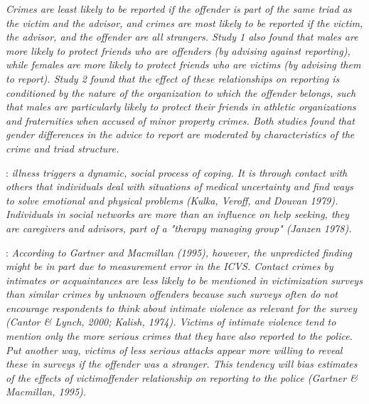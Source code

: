 \documentclass[]{article}
\begin{document}
	\cite{knoth2019reporting}
	\textit{Crimes are least likely to be reported if the offender is part of the same triad as the victim and the advisor, and crimes are most likely to be reported if the victim, the advisor, and the offender are all strangers. Study 1 also found that males are more likely to protect friends who are offenders (by advising against reporting), while females are more likely to protect friends who are victims (by advising them to report). Study 2 found that the effect of these relationships on reporting is conditioned by the nature of the organization to which the offender belongs, such that males are particularly likely to protect their friends in athletic organizations and fraternities when accused of minor property crimes. Both studies found that gender differences in the advice to report are moderated by characteristics of the crime and triad structure.
	}
	
	
	
	
	\cite{pescosolido1992beyond}:\textit{ illness triggers a dynamic, social process of coping. It is through contact with others that individuals deal with situations of medical uncertainty and find ways to solve emotional and physical problems (Kulka, Veroff, and Douvan 1979). Individuals in social networks are more than an influence on help seeking, they are caregivers and advisors, part of a "therapy managing group" (Janzen 1978).}
	
	\cite{goudriaan2004reporting}: \textit{According to Gartner and Macmillan (1995), however, the unpredicted finding might be in part due to measurement error in the ICVS. Contact crimes by intimates or acquaintances are less likely to be mentioned in victimization surveys than similar crimes by unknown offenders because such surveys often do not encourage respondents to think about intimate violence as relevant for the survey (Cantor \& Lynch, 2000; Kalish, 1974). Victims of intimate violence tend to mention only the more serious crimes that they have also reported to the police. Put another way, victims of less serious attacks appear more willing to reveal these in surveys if the offender was a stranger. This tendency will bias estimates of the effects of victimoffender relationship on reporting to the police (Gartner \& Macmillan, 1995).}
	
\end{document}
